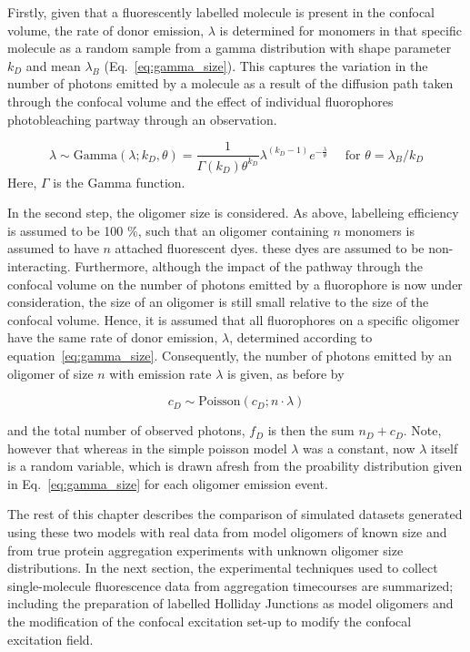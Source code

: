 Firstly, given that a fluorescently labelled molecule is present in the confocal volume, the rate of donor emission, $\lambda$ is determined for monomers in that specific molecule as a random sample from a gamma distribution with shape parameter $k_D$ and mean $\lambda_B$ (Eq.~\ref{eq:gamma_size}). This captures the variation in the number of photons emitted by a molecule as a result of the diffusion path taken through the confocal volume and the effect of individual fluorophores photobleaching partway through an observation.

\begin{equation}
\lambda \sim \text{Gamma}(\lambda; k_D, \theta) =  \frac{1}{\Gamma(k_D) \theta^{k_D}} \lambda^{(k_D - 1)} e^{-\frac{\lambda}{\theta}} \quad\text{ for } \theta = \lambda_B / k_D
\label{eq:gamma_size}
\end{equation} 
Here, $\Gamma$ is the Gamma function. 

In the second step, the oligomer size is considered. As above, labelleing efficiency is assumed to be 100 \%, such that an oligomer containing $n$ monomers is assumed to have $n$ attached fluorescent dyes. these dyes are assumed to be non-interacting. Furthermore, although the impact of the pathway through the confocal volume on the number of photons emitted by a fluorophore is now under consideration, the size of an oligomer is still small relative to the size of the confocal volume. Hence, it is assumed that all fluorophores on a specific oligomer have the same rate of donor emission, $\lambda$, determined according to equation~\ref{eq:gamma_size}. Consequently, the number of photons emitted by an oligomer of size $n$ with emission rate $\lambda$ is given, as before by

\begin{equation}
c_D \sim \text{Poisson}(c_D; n \cdot \lambda)
\end{equation}  

and the total number of observed photons, $f_D$ is then the sum $n_D + c_D$. Note, however that whereas in the simple poisson model $\lambda$ was a constant, now $\lambda$ itself is a random variable, which is drawn afresh from the proability distribution given in Eq.~\ref{eq:gamma_size} for each oligomer emission event.

The rest of this chapter describes the comparison of simulated datasets generated using these two models with real data from model oligomers of known size and from true protein aggregation experiments with unknown oligomer size distributions. In the next section, the experimental techniques used to collect single-molecule fluorescence data from aggregation timecourses are summarized; including the preparation of labelled Holliday Junctions as model oligomers and the modification of the confocal excitation set-up to modify the confocal excitation field. 

